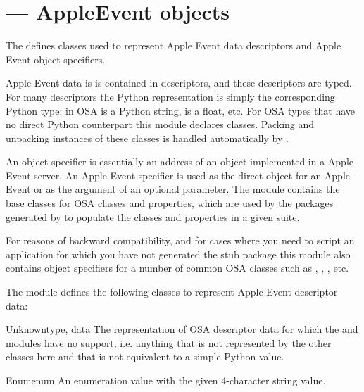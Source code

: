\section{ ---
         AppleEvent objects}



The  defines classes used to represent Apple Event data
descriptors and Apple Event object specifiers.

Apple Event data is is contained in descriptors, and these descriptors
are typed. For many descriptors the Python representation is simply the
corresponding Python type:  in OSA is a Python string,
 is a float, etc. For OSA types that have no direct
Python counterpart this module declares classes. Packing and unpacking
instances of these classes is handled automatically by .

An object specifier is essentially an address of an object implemented
in a Apple Event server. An Apple Event specifier is used as the direct
object for an Apple Event or as the argument of an optional parameter.
The  module contains the base classes for OSA classes
and properties, which are used by the packages generated by
 to populate the classes and properties in a
given suite.

For reasons of backward compatibility, and for cases where you need to
script an application for which you have not generated the stub package
this module also contains object specifiers for a number of common OSA
classes such as , , , etc.



The  module defines the following classes to represent
Apple Event descriptor data:

\begin{classdesc}{Unknown}{type, data}
The representation of OSA descriptor data for which the 
and  modules have no support, i.e. anything that is not
represented by the other classes here and that is not equivalent to a
simple Python value.
\end{classdesc}

\begin{classdesc}{Enum}{enum}
An enumeration value with the given 4-character string value.
\end{classdesc}


